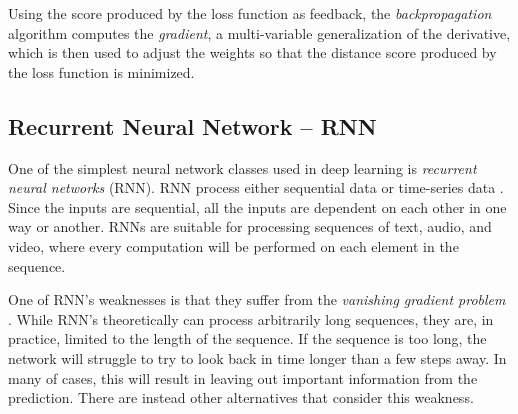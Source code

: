 \documentclass[nofilelist]{cslthse-msc}
\begin{document}
Using the score produced by the loss function as feedback, the \textit{backpropagation} algorithm computes the \textit{gradient}, a multi-variable generalization of the derivative, which is then used to adjust the weights so that the distance score produced by the loss function is minimized. 


\subsection{Recurrent Neural Network -- RNN}

One of the simplest neural network classes used in deep learning is \emph{recurrent neural networks} (RNN). RNN process either sequential data or time-series data \citep{lipton2015critical}. Since the inputs are sequential, all the inputs are dependent on each other in one way or another. RNNs are suitable for processing sequences of text, audio, and video, where every computation will be performed on each element in the sequence.

One of RNN's weaknesses is that they suffer from the \textit{vanishing gradient problem} \citep{hochreiter1998}. While RNN's theoretically can process arbitrarily long sequences, they are, in practice, limited to the length of the sequence. If the sequence is too long, the network will struggle to try to look back in time longer than a few steps away. In many of cases, this will result in leaving out important information from the prediction. There are instead other alternatives that consider this weakness. 



 
\end{document}
